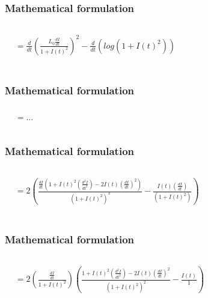 \documentclass[aspectratio=1610]{beamer}
\begin{document}
\begin{frame}
\frametitle{Mathematical formulation}
\begin{columns}
\column{37em}
\huge
\begin{align*}
& = \frac{d}{dt}\left(\frac{L_{0}\frac{dI}{dt}}{1+I(t)^{2}}\right)^{2}-\frac{d}{dt}\left(log\left(1+I(t)^{2}\right)\right)\\
\end{align*}
\end{columns}
\end{frame}
\begin{frame}
\frametitle{Mathematical formulation}
\begin{columns}
\column{37em}
\huge
\begin{align*}
& = ...
\end{align*}
\end{columns}
\end{frame}
\begin{frame}
\frametitle{Mathematical formulation}
\begin{columns}
\column{37em}
\LARGE
\begin{align*}
& = 2\left({\frac{\frac{dI}{dt}\left(1+I(t)^{2}\left(\frac{d^{2}I}{dt^{2}}\right)-2I(t)\left(\frac{dI}{dt}\right)^{2}\right)}{\left(1+I(t)^{2}\right)^{3}}} -   {\frac{I(t)\left(\frac{dI}{dt}\right)}{\left(1+I(t)^{2}\right)}}\right)\\
\end{align*}
\end{columns}
\end{frame}
\begin{frame}
\frametitle{Mathematical formulation}
\begin{columns}
\column{37em}
\LARGE
\begin{align*}
& = 2\left(\frac{\frac{dI}{dt}}{1+I(t)^{2}}\right)   \left({\frac{1+I(t)^{2}\left(\frac{d^{2}I}{dt^{2}}\right)-2I(t)\left(\frac{dI}{dt}\right)^{2}}{\left(1+I(t)^{2}\right)^{2}}} -   {\frac{I(t)}{1}}\right)\\
\end{align*}
\end{columns}
\end{frame}
\end{document}
